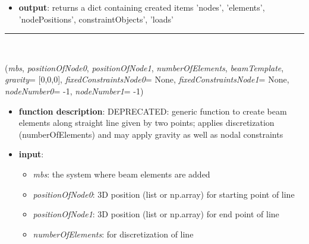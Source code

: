 \begin{itemize}[leftmargin=1.4cm]
\begin{itemize}[leftmargin=1.4cm]
\begin{itemize}[leftmargin=1.4cm]
\begin{itemize}[leftmargin=0.5cm]
\begin{itemize}[leftmargin=1.4cm]
\begin{itemize}[leftmargin=0.7cm]
\begin{itemize}[leftmargin=1.2cm]
\item[]{\it groundConstraintsEnd}: a list of True/False values, indicating the coordinate contraints on the last node (position and slope); must agree with the number of coordinates in the node; use None to add no constraints
\item[]{\it nodeNumberStart}: if not None, this node number defines the node that shall be used at positionStart; allow to connect with other beams
\item[]{\it nodeNumberEnd}: if not None, this node number defines the node that shall be used at positionEnd; allow to connect with other beams
\end{itemize}
\item[--]
{\bf output}: returns a dict containing created items {'nodes', 'elements', 'nodePositions', constraintObjects', 'loads'}
\vspace{12pt}\end{itemize}
%
\noindent\rule{8cm}{0.75pt}\vspace{1pt} \\ 
\begin{flushleft}
\label{sec:beams:GenerateStraightBeam}
({\it mbs}, {\it positionOfNode0}, {\it positionOfNode1}, {\it numberOfElements}, {\it beamTemplate}, {\it gravity}= [0,0,0], {\it fixedConstraintsNode0}= None, {\it fixedConstraintsNode1}= None, {\it nodeNumber0}= -1, {\it nodeNumber1}= -1)
\end{flushleft}
\setlength{\itemindent}{0.7cm}
\begin{itemize}[leftmargin=0.7cm]
\item[--]
{\bf function description}: DEPRECATED: generic function to create beam elements along straight line given by two points; applies discretization (numberOfElements) and may apply gravity as well as nodal constraints
\item[--]
{\bf input}: \vspace{-6pt}
\begin{itemize}[leftmargin=1.2cm]
\setlength{\itemindent}{-0.7cm}
\item[]{\it mbs}: the system where beam elements are added
\item[]{\it positionOfNode0}: 3D position (list or np.array) for starting point of line
\item[]{\it positionOfNode1}: 3D position (list or np.array) for end point of line
\item[]{\it numberOfElements}: for discretization of line

\end{itemize}
\end{itemize}
\end{itemize}
\end{itemize}
\end{itemize}
\end{itemize}
\end{itemize}
